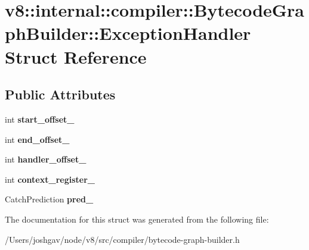 \hypertarget{structv8_1_1internal_1_1compiler_1_1_bytecode_graph_builder_1_1_exception_handler}{}\section{v8\+:\+:internal\+:\+:compiler\+:\+:Bytecode\+Graph\+Builder\+:\+:Exception\+Handler Struct Reference}
\label{structv8_1_1internal_1_1compiler_1_1_bytecode_graph_builder_1_1_exception_handler}
\subsection*{Public Attributes}
\begin{DoxyCompactItemize}
\item 
int {\bfseries start\+\_\+offset\+\_\+}\hypertarget{structv8_1_1internal_1_1compiler_1_1_bytecode_graph_builder_1_1_exception_handler_a69285edbd1e7e2fbdc5f6129ffb0f615}{}\label{structv8_1_1internal_1_1compiler_1_1_bytecode_graph_builder_1_1_exception_handler_a69285edbd1e7e2fbdc5f6129ffb0f615}

\item 
int {\bfseries end\+\_\+offset\+\_\+}\hypertarget{structv8_1_1internal_1_1compiler_1_1_bytecode_graph_builder_1_1_exception_handler_a86c1ee87a4cd1efbb9d3f95d1f1e000c}{}\label{structv8_1_1internal_1_1compiler_1_1_bytecode_graph_builder_1_1_exception_handler_a86c1ee87a4cd1efbb9d3f95d1f1e000c}

\item 
int {\bfseries handler\+\_\+offset\+\_\+}\hypertarget{structv8_1_1internal_1_1compiler_1_1_bytecode_graph_builder_1_1_exception_handler_a456d0a54778b77d775ed36a08e740b75}{}\label{structv8_1_1internal_1_1compiler_1_1_bytecode_graph_builder_1_1_exception_handler_a456d0a54778b77d775ed36a08e740b75}

\item 
int {\bfseries context\+\_\+register\+\_\+}\hypertarget{structv8_1_1internal_1_1compiler_1_1_bytecode_graph_builder_1_1_exception_handler_aebd7afedf476114b5e812f35d71d4c6b}{}\label{structv8_1_1internal_1_1compiler_1_1_bytecode_graph_builder_1_1_exception_handler_aebd7afedf476114b5e812f35d71d4c6b}

\item 
Catch\+Prediction {\bfseries pred\+\_\+}\hypertarget{structv8_1_1internal_1_1compiler_1_1_bytecode_graph_builder_1_1_exception_handler_a404d54f6b6887aadc395e927e0c47a20}{}\label{structv8_1_1internal_1_1compiler_1_1_bytecode_graph_builder_1_1_exception_handler_a404d54f6b6887aadc395e927e0c47a20}

\end{DoxyCompactItemize}


The documentation for this struct was generated from the following file\+:\begin{DoxyCompactItemize}
\item 
/\+Users/joshgav/node/v8/src/compiler/bytecode-\/graph-\/builder.\+h\end{DoxyCompactItemize}
